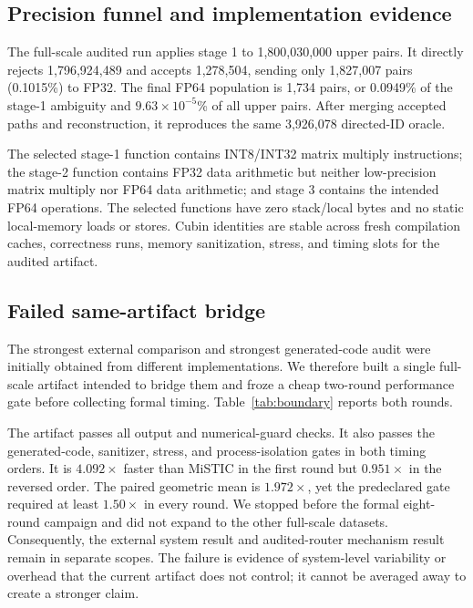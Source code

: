 \documentclass[sigconf,review,anonymous]{acmart}
\begin{document}
\subsection{Precision funnel and implementation evidence}

The full-scale audited run applies stage 1 to 1,800,030,000 upper pairs.
It directly rejects 1,796,924,489 and accepts 1,278,504, sending only
1,827,007 pairs (0.1015\%) to FP32.  The final FP64 population is 1,734 pairs,
or 0.0949\% of the stage-1 ambiguity and $9.63\times10^{-5}$\% of all upper
pairs.  After merging accepted paths and reconstruction, it reproduces the
same 3,926,078 directed-ID oracle.

The selected stage-1 function contains INT8/INT32 matrix multiply instructions;
the stage-2 function contains FP32 data arithmetic but neither low-precision
matrix multiply nor FP64 data arithmetic; and stage 3 contains the intended
FP64 operations.  The selected functions have zero stack/local bytes and no
static local-memory loads or stores.  Cubin identities are stable across fresh
compilation caches, correctness runs, memory sanitization, stress, and timing
slots for the audited artifact.

\subsection{Failed same-artifact bridge}

The strongest external comparison and strongest generated-code audit were
initially obtained from different implementations.  We therefore built a
single full-scale artifact intended to bridge them and froze a cheap two-round
performance gate before collecting formal timing.  Table~\ref{tab:boundary}
reports both rounds.



The artifact passes all output and numerical-guard checks.  It also passes the
generated-code, sanitizer, stress, and process-isolation gates in both timing
orders.  It is $4.092\times$ faster
than MiSTIC in the first round but $0.951\times$ in the reversed order.  The
paired geometric mean is $1.972\times$, yet the predeclared gate required at
least $1.50\times$ in every round.  We stopped before the formal eight-round
campaign and did not expand to the other full-scale datasets.  Consequently,
the external system result and audited-router mechanism result remain in
separate scopes.  The failure is evidence of system-level variability or
overhead that the current artifact does not control; it cannot be averaged
away to create a stronger claim.
\end{document}
